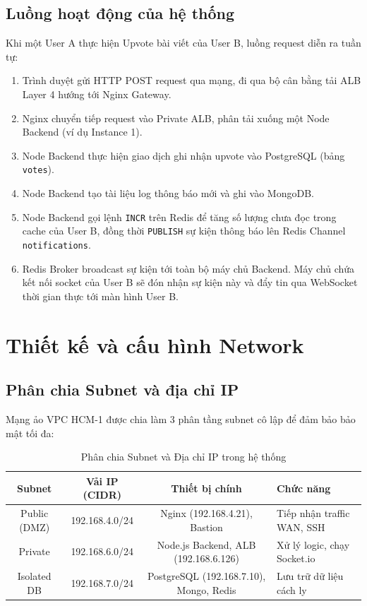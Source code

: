 \documentclass[12pt, a4paper]{article}
\begin{document}
\subsection{Luồng hoạt động của hệ thống}
Khi một User A thực hiện Upvote bài viết của User B, luồng request diễn ra tuần tự:
\begin{enumerate}
    \item Trình duyệt gửi HTTP POST request qua mạng, đi qua bộ cân bằng tải ALB Layer 4 hướng tới Nginx Gateway.
    \item Nginx chuyển tiếp request vào Private ALB, phân tải xuống một Node Backend (ví dụ Instance 1).
    \item Node Backend thực hiện giao dịch ghi nhận upvote vào PostgreSQL (bảng \texttt{votes}).
    \item Node Backend tạo tài liệu log thông báo mới và ghi vào MongoDB.
    \item Node Backend gọi lệnh \texttt{INCR} trên Redis để tăng số lượng chưa đọc trong cache của User B, đồng thời \texttt{PUBLISH} sự kiện thông báo lên Redis Channel \texttt{notifications}.
    \item Redis Broker broadcast sự kiện tới toàn bộ máy chủ Backend. Máy chủ chứa kết nối socket của User B sẽ đón nhận sự kiện này và đẩy tin qua WebSocket thời gian thực tới màn hình User B.
\end{enumerate}



\section{Thiết kế và cấu hình Network}

\subsection{Phân chia Subnet và địa chỉ IP}
Mạng ảo VPC HCM-1 được chia làm 3 phân tầng subnet cô lập để đảm bảo bảo mật tối đa:
\begin{table}[H]
    \centering
    \caption{Phân chia Subnet và Địa chỉ IP trong hệ thống}
    \label{tab:subnet_config}
    \begin{tabular}{|c|c|c|l|}
        \hline
        \textbf{Subnet} & \textbf{Vải IP (CIDR)} & \textbf{Thiết bị chính} & \textbf{Chức năng} \\
        \hline
        Public (DMZ) & 192.168.4.0/24 & Nginx (192.168.4.21), Bastion & Tiếp nhận traffic WAN, SSH \\
        \hline
        Private & 192.168.6.0/24 & Node.js Backend, ALB (192.168.6.126) & Xử lý logic, chạy Socket.io \\
        \hline
        Isolated DB & 192.168.7.0/24 & PostgreSQL (192.168.7.10), Mongo, Redis & Lưu trữ dữ liệu cách ly \\
        \hline
    \end{tabular}
\end{table}
\end{document}
